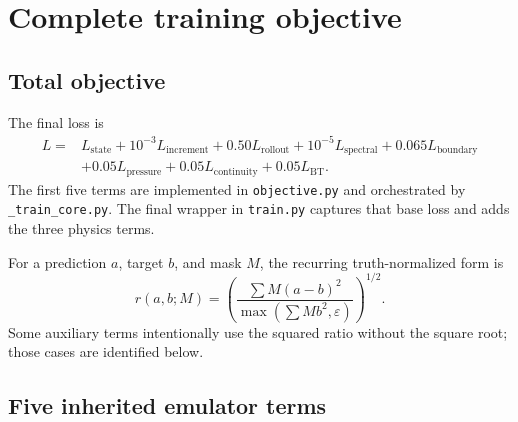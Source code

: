 \documentclass[11pt,oneside]{report}
\newcommand{\repo}[1]{\nolinkurl{#1}}
\newcommand{\eps}{\varepsilon}
\begin{document}
\chapter{Complete training objective}
\label{ch:loss}

\section{Total objective}

The final loss is
\begin{align}
L={}&L_{\mathrm{state}}
+10^{-3}L_{\mathrm{increment}}
+0.50L_{\mathrm{rollout}}
+10^{-5}L_{\mathrm{spectral}}
+0.065L_{\mathrm{boundary}}
\nonumber\\
&+0.05L_{\mathrm{pressure}}
+0.05L_{\mathrm{continuity}}
+0.05L_{\mathrm{BT}}.
\label{eq:total-loss}
\end{align}
The first five terms are implemented in \repo{objective.py} and orchestrated by
\repo{_train_core.py}. The final wrapper in \repo{train.py} captures that base
loss and adds the three physics terms.

For a prediction \(a\), target \(b\), and mask \(M\), the recurring
truth-normalized form is
\begin{equation}
  r(a,b;M)
  =
  \left(
    \frac{\sum M(a-b)^2}
         {\max(\sum Mb^2,\eps)}
  \right)^{1/2}.
\end{equation}
Some auxiliary terms intentionally use the squared ratio without the square
root; those cases are identified below.

\section{Five inherited emulator terms}
\end{document}
